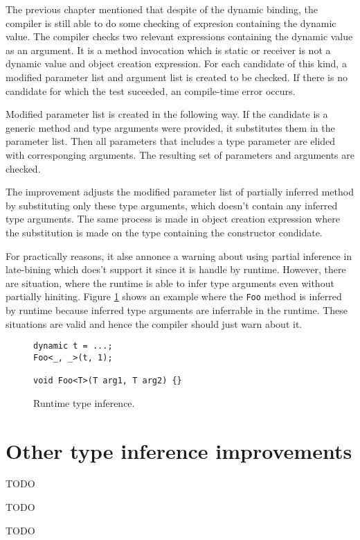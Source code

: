 The previous chapter mentioned that despite of the dynamic binding, the compiler is still able to do some checking of expresion containing the dynamic value.
The compiler checks two relevant expressions containing the dynamic value as an argument.
It is a method invocation which is static or receiver is not a dynamic value and object creation expression.
For each candidate of this kind, a modified parameter list and argument list is created to be checked.
If there is no candidate for which the test suceeded, an compile-time error occurs.
\par
Modified parameter list is created in the following way.
If the candidate is a generic method and type arguments were provided, it substitutes them in the parameter list.
Then all parameters that includes a type parameter are elided with corresponging arguments.
The resulting set of parameters and arguments are checked.
\par
The improvement adjusts the modified parameter list of partially inferred method by substituting only these type arguments, which doesn't contain any inferred type arguments.
The same process is made in object creation expression where the substitution is made on the type containing the constructor condidate.
\par
For practically reasons, it alse annonce a warning about using partial inference in late-bining which does't support it since it is handle by runtime.
However, there are situation, where the runtime is able to infer type arguments even without partially hiniting.
Figure \ref{img63:dinamic} shows an example where the \texttt{Foo} method is inferred by runtime because inferred type arguments are inferrable in the runtime.
These situations are valid and hence the compiler should just warn about it.
\begin{figure}[h!]
\begin{lstlisting}[style=csharp, mathescape=true]
dynamic t = ...;
Foo<_, _>(t, 1);

void Foo<T>(T arg1, T arg2) {}
\end{lstlisting}
\caption{Runtime type inference.}
\label{img63:dinamic}
\end{figure}

\section{Other type inference improvements}

TODO


TODO


TODO